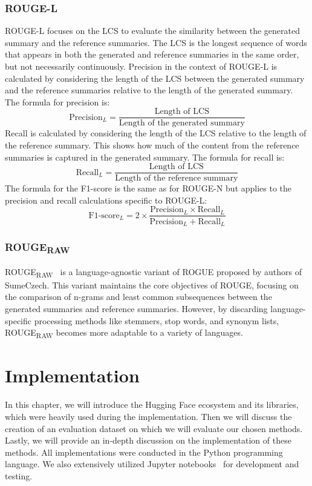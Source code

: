 \documentclass[english, ba, kiv, he, iso690numb, pdf, viewonly]{fasthesis}
\begin{document}
\subsection{ROUGE-L}
ROUGE-L focuses on the LCS to evaluate the similarity between the generated summary and the reference summaries. The LCS is the longest sequence of words that appears in both the generated and reference summaries in the same order, but not necessarily continuously. 
Precision in the context of ROUGE-L is calculated by considering the length of the LCS between the generated summary and the reference summaries relative to the length of the generated summary. The formula for precision is:
$$
\text{Precision}_{L} = \frac{\text{Length of LCS}}{\text{Length of the generated summary}}
$$
Recall is calculated by considering the length of the LCS relative to the length of the reference summary. This shows how much of the content from the reference summaries is captured in the generated summary. The formula for recall is:
$$
\text{Recall}_{L} = \frac{\text{Length of LCS}}{\text{Length of the reference summary}}
$$
The formula for the F1-score is the same as for ROUGE-N but applies to the precision and recall calculations specific to ROUGE-L:
$$
\text{F1-score}_{L} = 2 \times \frac{\text{Precision}_{L} \times \text{Recall}_{L}}{\text{Precision}_{L} + \text{Recall}_{L}}
$$
\subsection{ROUGE\textsubscript{RAW}}
ROUGE\textsubscript{RAW}~\cite{straka-etal-2018-sumeczech} is a language-agnostic variant of ROGUE proposed by authors of SumeCzech. This variant maintains the core objectives of ROUGE, focusing on the comparison of n-grams and least common subsequences between the generated summaries and reference summaries. However, by discarding language-specific processing methods like stemmers, stop words, and synonym lists, ROUGE\textsubscript{RAW} becomes more adaptable to a variety of languages.

\chapter{Implementation} \label{char:implementation}
In this chapter, we will introduce the Hugging Face ecosystem and its libraries, which were heavily used during the implementation. Then we will discuss the creation of an evaluation dataset on which we will evaluate our chosen methods.  Lastly, we will provide an in-depth discussion on the implementation of these methods. All implementations were conducted in the Python programming language. We also extensively utilized Jupyter notebooks~\cite{Kluyver2016jupyter} for development and testing.
\end{document}
